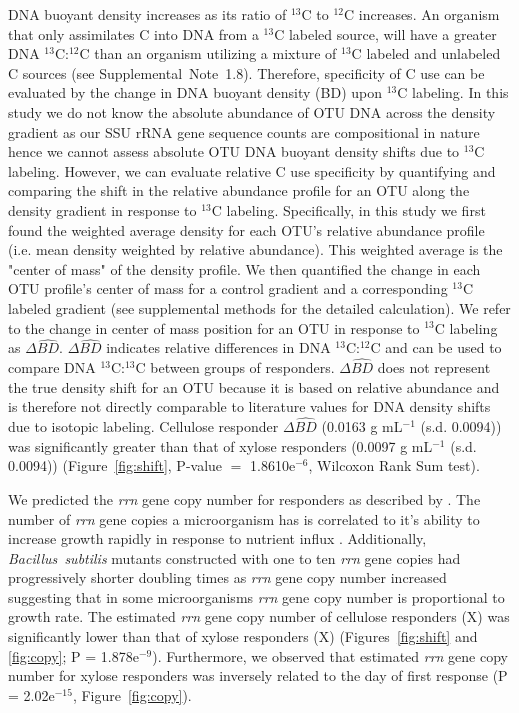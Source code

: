 DNA buoyant density increases as its ratio of $^{13}$C to $^{12}$C increases.
An organism that only assimilates C into DNA from a $^{13}$C labeled source,
will have a greater DNA $^{13}$C:$^{12}$C than an organism utilizing a mixture
of $^{13}$C labeled and unlabeled C sources (see Supplemental~Note~1.8).
Therefore, specificity of C use can be evaluated by the change in DNA
buoyant density (BD) upon $^{13}$C labeling. In this study we do not know the
absolute abundance of OTU DNA across the density gradient as our SSU rRNA gene
sequence counts are compositional in nature hence we cannot assess absolute OTU
DNA buoyant density shifts due to $^{13}$C labeling. However, we can evaluate
relative C use specificity by quantifying and comparing the shift in the
relative abundance profile for an OTU along the density gradient in response to
$^{13}$C labeling. Specifically, in this study we first found the weighted
average density for each OTU's relative abundance profile (i.e. mean density
weighted by relative abundance). This weighted average is the "center of mass"
of the density profile. We then quantified the change in each OTU profile's
center of mass for a control gradient and a corresponding $^{13}$C labeled
gradient (see supplemental methods for the detailed calculation). We refer to
the change in center of mass position for an OTU in response to $^{13}$C
labeling as $\Delta\hat{BD}$. $\Delta\hat{BD}$ indicates relative differences
in DNA $^{13}$C:$^{12}$C and can be used to compare DNA $^{13}$C:$^{13}$C
between groups of responders. $\Delta\hat{BD}$ does not represent the true
density shift for an OTU because it is based on relative abundance and is
therefore not directly comparable to literature values for DNA density shifts
due to isotopic labeling. Cellulose responder $\Delta\hat{BD}$ (0.0163
g mL$^{-1}$ (s.d. 0.0094)) was significantly greater than that of xylose
responders (0.0097 g mL$^{-1}$ (s.d. 0.0094)) (Figure~\ref{fig:shift}, P-value
$=$ 1.8610e$^{-6}$, Wilcoxon Rank Sum test). 

We predicted the \textit{rrn} gene copy number for responders as described
by \citet{Kembel_2012}. The number of \textit{rrn} gene copies
a microorganism has is correlated to it's ability to increase growth
rapidly in response to nutrient influx \citep{Klappenbach_2000}.
Additionally, \textit{Bacillus~subtilis} mutants constructed with one to
ten \textit{rrn} gene copies had progressively shorter doubling times as
\textit{rrn} gene copy number increased \citep{yano_multiple_2013}
suggesting that in some microorganisms \textit{rrn} gene copy number is
proportional to growth rate. The estimated \textit{rrn} gene
copy number of cellulose responders (X) was significantly lower than that
of xylose responders (X) (Figures~\ref{fig:shift} and \ref{fig:copy};
P = 1.878e$^{-9}$). Furthermore, we observed that estimated \textit{rrn}
gene copy number for xylose responders was inversely related to the day of
first response (P = 2.02e$^{-15}$, Figure~\ref{fig:copy}).

